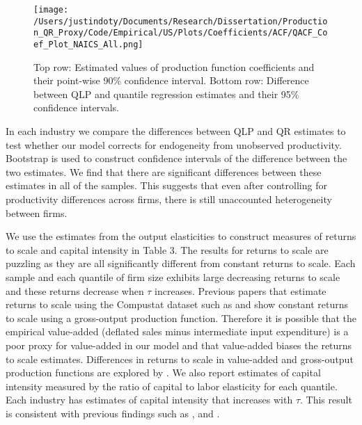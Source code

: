 \documentclass[11pt]{article}
\begin{document}
\begin{figure}[H]
\centering
\texttt{[image: /Users/justindoty/Documents/Research/Dissertation/Production\_QR\_Proxy/Code/Empirical/US/Plots/Coefficients/ACF/QACF\_Coef\_Plot\_NAICS\_All.png]}
\caption{Top row: Estimated values of production function coefficients and their point-wise 90\% confidence interval. Bottom row: Difference between QLP and quantile regression estimates and their 95\% confidence intervals.}
\label{fig:USallcoef}
\end{figure}

In each industry we compare the differences between QLP and QR estimates to test whether our model corrects for endogeneity from unobserved productivity. Bootstrap is used to construct confidence intervals of the difference between the two estimates. We find that there are significant differences between these estimates in all of the samples. This suggests that even after controlling for productivity differences across firms, there is still unaccounted heterogeneity between firms.

We use the estimates from the output elasticities to construct measures of returns to scale and capital intensity in Table 3. The results for returns to scale are puzzling as they are all significantly different from constant returns to scale. Each sample and each quantile of firm size exhibits large decreasing returns to scale and these returns decrease when $\tau$ increases. Previous papers that estimate returns to scale using the Compustat dataset such as \cite{Keller2009} and \cite{mert} show constant returns to scale using a gross-output production function. Therefore it is possible that the empirical value-added (deflated sales minus intermediate input expenditure) is a poor proxy for value-added in our model and that value-added biases the returns to scale estimates. Differences in returns to scale in value-added and gross-output production functions are explored by \cite{Basu1997}. We also report estimates of capital intensity measured by the ratio of capital to labor elasticity for each quantile. Each industry has estimates of capital intensity that increases with $\tau$. This result is consistent with previous findings such as \cite{Holmes2008}, \cite{Kumar1999} and \cite{mert}.
\end{document}
